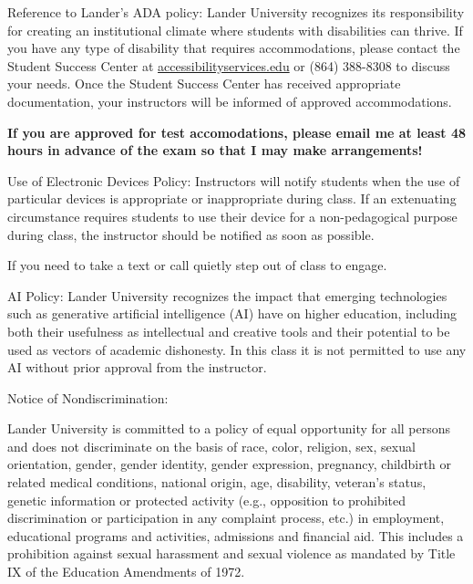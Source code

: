 \documentclass{article}
\begin{document}
\item[Reference to Lander’s ADA policy:]
  Lander University recognizes its responsibility for creating an
  institutional climate where students with disabilities can
  thrive. If you have any type of disability that requires
  accommodations, please contact the Student Success Center at
  \href{mailto:accessibilityservices@lander.edu}{accessibilityservices\allowbreak@lander.edu}
  or (864) 388-8308 to discuss your needs. Once the Student Success
  Center has received appropriate documentation, your instructors
  will be informed of approved accommodations.

  \textbf{If you are approved for test accomodations, please email me at
  least 48 hours in advance of the exam so that I may make arrangements!}

\item[Use of Electronic Devices Policy:]
  Instructors will notify students when the use of particular devices is appropriate or inappropriate during class. If an extenuating circumstance requires students to use their device for a non-pedagogical purpose during class, the instructor should be notified as soon as possible.

  If you need to take a text or call quietly step out of class to engage.

\item[AI Policy:]
  Lander University recognizes the impact that emerging technologies such as generative artificial intelligence (AI) have on higher education, including both their usefulness as intellectual and creative tools and their potential to be used as vectors of academic dishonesty. In this class it is not permitted to use any AI without prior approval from the instructor.

\item[Notice of Nondiscrimination:]

  Lander University is committed to a policy of equal opportunity for all persons and does not discriminate on the basis of race, color, religion, sex, sexual orientation, gender, gender identity, gender expression, pregnancy, childbirth or related medical conditions, national origin, age, disability, veteran’s status, genetic information or protected activity (e.g., opposition to prohibited discrimination or participation in any complaint process, etc.) in employment, educational programs and activities, admissions and financial aid. This includes a prohibition against sexual harassment and sexual violence as mandated by Title IX of the Education Amendments of 1972.
\end{document}
